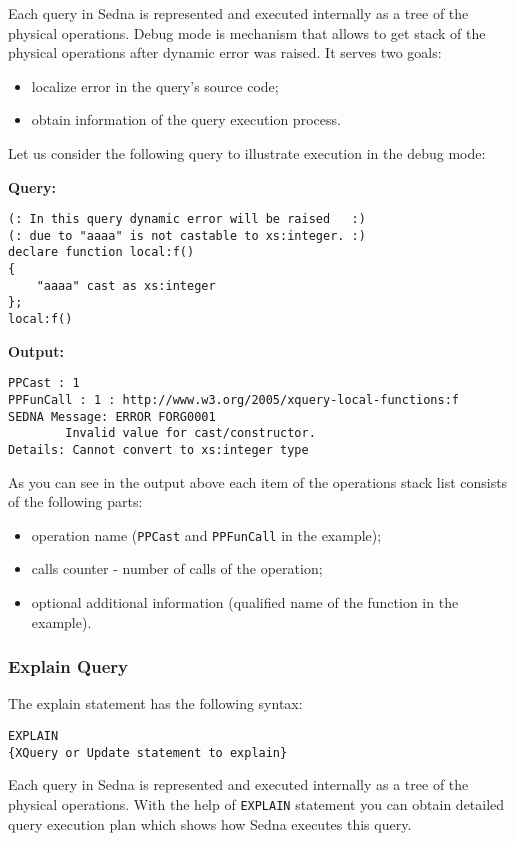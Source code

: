 \documentclass[a4paper,12pt]{article}
\newenvironment{citemize}
{\begin{itemize}
  \setlength{\itemsep}{0pt}
  \setlength{\parskip}{0pt}
  \setlength{\parsep}{0pt}}
{\end{itemize}}
\begin{document}
Each query in Sedna is represented and executed internally as a tree of the
physical operations. Debug mode is mechanism that allows to get stack of the
physical operations after dynamic error was raised. It serves two goals:

\begin{citemize}
\item localize error in the query's source code;
\item obtain information of the query execution process.
\end{citemize}

Let us consider the following query to illustrate execution in the debug mode:

\medskip
\noindent
\textbf{Query:}

\begin{verbatim}
(: In this query dynamic error will be raised   :)
(: due to "aaaa" is not castable to xs:integer. :)
declare function local:f()
{
    "aaaa" cast as xs:integer
};
local:f()
\end{verbatim}
\textbf{Output:}
\begin{verbatim}
PPCast : 1
PPFunCall : 1 : http://www.w3.org/2005/xquery-local-functions:f
SEDNA Message: ERROR FORG0001
        Invalid value for cast/constructor.
Details: Cannot convert to xs:integer type
\end{verbatim}

As you can see in the output above each item of the operations stack list
consists of the following parts:

\begin{itemize}
\item operation name (\verb!PPCast! and \verb!PPFunCall! in the example);
\item calls counter - number of calls of the operation;
\item optional additional information (qualified name of the function in the
example).
\end{itemize}


\subsubsection{Explain Query}
\label{explain}

The explain statement has the following syntax:
\begin{verbatim}
EXPLAIN
{XQuery or Update statement to explain}
\end{verbatim}
Each query in Sedna is represented and executed internally as a tree of the
physical operations. With the help of \verb!EXPLAIN! statement you can obtain
detailed query execution plan which shows how Sedna executes this query.
\end{document}
